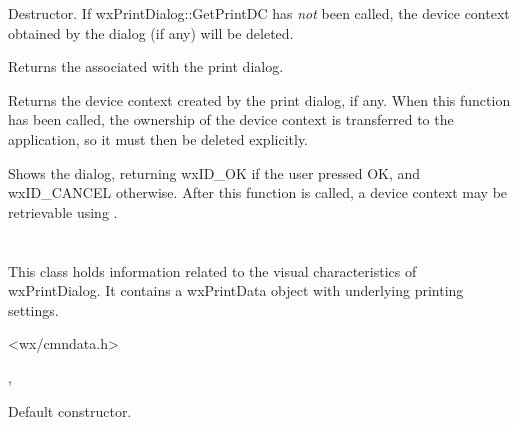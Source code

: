 Destructor. If wxPrintDialog::GetPrintDC has {\it not} been called,
the device context obtained by the dialog (if any) will be deleted.

\label{wxprintdialoggetprintdialogdata}


Returns the  associated with the print dialog.

\label{wxprintdialoggetprintdc}


Returns the device context created by the print dialog, if any.
When this function has been called, the ownership of the device context
is transferred to the application, so it must then be deleted
explicitly.

\label{wxprintdialogshowmodal}


Shows the dialog, returning wxID\_OK if the user pressed OK, and wxID\_CANCEL
otherwise. After this function is called, a device context may
be retrievable using .

\section{}\label{wxprintdialogdata}

This class holds information related to the visual characteristics of wxPrintDialog.
It contains a wxPrintData object with underlying printing settings.




<wx/cmndata.h>


, 




Default constructor.

